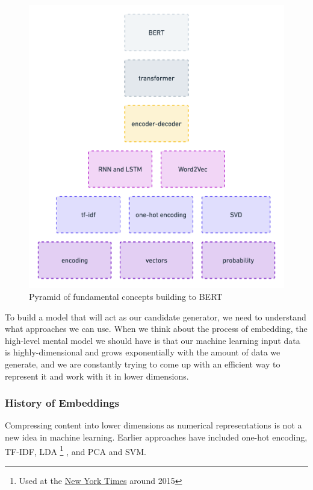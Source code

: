 \documentclass[draft, 11pt]{diazessay} %
\begin{document}
\begin{figure}[!ht]
\centering
\includegraphics[width=\textwidth]{figures/pyramid.png}
\caption{Pyramid of fundamental concepts building to BERT}
\end{figure}

To build a model that will act as our candidate generator, we need to understand what approaches we can use. When we think about the process of embedding, the high-level mental model we should have is that our machine learning input data is highly-dimensional and grows exponentially with the amount of data we generate, and we are constantly trying to come up with an efficient way to represent it and work with it in lower dimensions.

\subsubsection{History of Embeddings}
Compressing content into lower dimensions as numerical representations is not a new idea in machine learning. Earlier approaches have included one-hot encoding, TF-IDF, LDA \footnote{Used at the \href{https://archive.nytimes.com/open.blogs.nytimes.com/2015/08/11/building-the-next-new-york-times-recommendation-engine/}{New York Times} around 2015} , and PCA and SVM. 
\end{document}
